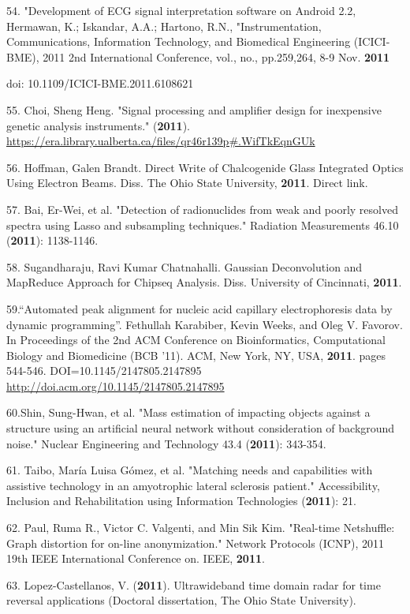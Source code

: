 54. "Development of ECG signal interpretation software on Android 2.2, Hermawan, K.; Iskandar, A.A.; Hartono, R.N., "Instrumentation, Communications, Information Technology, and Biomedical Engineering (ICICI-BME), 2011 2nd International Conference, vol., no., pp.259,264, 8-9 Nov. \textbf{2011}

doi: 10.1109/ICICI-BME.2011.6108621

55. Choi, Sheng Heng. "Signal processing and amplifier design for inexpensive genetic analysis instruments." (\textbf{2011}). \url{https://era.library.ualberta.ca/files/qr46r139p\#.WifTkEqnGUk}

56. Hoffman, Galen Brandt. Direct Write of Chalcogenide Glass Integrated Optics Using Electron Beams. Diss. The Ohio State University, \textbf{2011}. Direct link.

57. Bai, Er-Wei, et al. "Detection of radionuclides from weak and poorly resolved spectra using Lasso and subsampling techniques." Radiation Measurements 46.10 (\textbf{2011}): 1138-1146.

58. Sugandharaju, Ravi Kumar Chatnahalli. Gaussian Deconvolution and MapReduce Approach for Chipseq Analysis. Diss. University of Cincinnati, \textbf{2011}.

59.``Automated peak alignment for nucleic acid capillary electrophoresis data by dynamic programming''. Fethullah Karabiber, Kevin Weeks, and Oleg V. Favorov. In Proceedings of the 2nd ACM Conference on Bioinformatics, Computational Biology and Biomedicine (BCB '11). ACM, New York, NY, USA, \textbf{2011}. pages 544-546. DOI=10.1145/2147805.2147895 \url{http://doi.acm.org/10.1145/2147805.2147895}

60.Shin, Sung-Hwan, et al. "Mass estimation of impacting objects against a structure using an artificial neural network without consideration of background noise." Nuclear Engineering and Technology 43.4 (\textbf{2011}): 343-354.

61. Taibo, Mar\'{i}a Luisa G\'{o}mez, et al. "Matching needs and capabilities with assistive technology in an amyotrophic lateral sclerosis patient." Accessibility, Inclusion and Rehabilitation using Information Technologies (\textbf{2011}): 21.

62. Paul, Ruma R., Victor C. Valgenti, and Min Sik Kim. "Real-time Netshuffle: Graph distortion for on-line anonymization." Network Protocols (ICNP), 2011 19th IEEE International Conference on. IEEE, \textbf{2011}.

63. Lopez-Castellanos, V. (\textbf{2011}). Ultrawideband time domain radar for time reversal applications (Doctoral dissertation, The Ohio State University).

